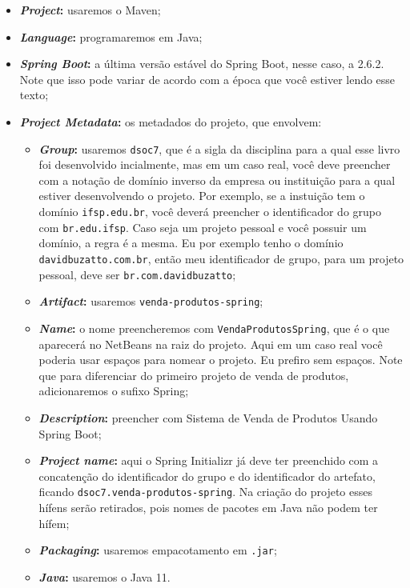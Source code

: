 \begin{itemize}
    \item \textbf{\textit{Project}:} usaremos o Maven;
    \item \textbf{\textit{Language}:} programaremos em Java;
    \item \textbf{\textit{Spring Boot}:} a última versão estável do Spring Boot, nesse caso, a 2.6.2. Note que isso pode variar de acordo com a época que você estiver lendo esse texto;
    \item \textbf{\textit{Project Metadata}:} os metadados do projeto, que envolvem:
    \begin{itemize}
        \item \textbf{\textit{Group}:} usaremos \texttt{dsoc7}, que é a sigla da disciplina para a qual esse livro foi desenvolvido incialmente, mas em um caso real, você deve preencher com a notação de domínio inverso da empresa ou instituição para a qual estiver desenvolvendo o projeto. Por exemplo, se a instuição tem o domínio \texttt{ifsp.edu.br}, você deverá preencher o identificador do grupo com \texttt{br.edu.ifsp}. Caso seja um projeto pessoal e você possuir um domínio, a regra é a mesma. Eu por exemplo tenho o domínio \texttt{davidbuzatto.com.br}, então meu identificador de grupo, para um projeto pessoal, deve ser \texttt{br.com.davidbuzatto};
        \item \textbf{\textit{Artifact}:} usaremos \texttt{venda-produtos-spring};
        \item \textbf{\textit{Name}:} o nome preencheremos com \texttt{VendaProdutosSpring}, que é o que aparecerá no NetBeans na raiz do projeto. Aqui em um caso real você poderia usar espaços para nomear o projeto. Eu prefiro sem espaços. Note que para diferenciar do primeiro projeto de venda de produtos, adicionaremos o sufixo Spring;
        \item \textbf{\textit{Description}:} preencher com Sistema de Venda de Produtos Usando Spring Boot;
        \item \textbf{\textit{Project name}:} aqui o Spring Initializr já deve ter preenchido com a concatenção do identificador do grupo e do identificador do artefato, ficando \texttt{dsoc7.venda-produtos-spring}. Na criação do projeto esses hífens serão retirados, pois nomes de pacotes em Java não podem ter hífem;
        \item \textbf{\textit{Packaging}:} usaremos empacotamento em \texttt{.jar};
        \item \textbf{\textit{Java}:} usaremos o Java 11.
    \end{itemize}
\end{itemize}

